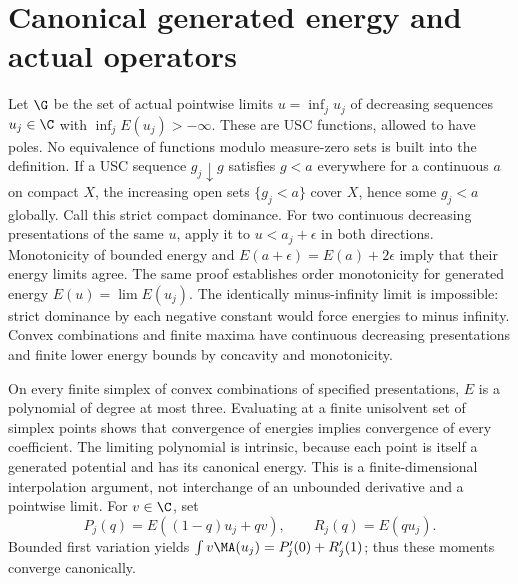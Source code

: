 \section{Canonical generated energy and actual operators}
Let $\G$ be the set of actual pointwise limits $u=\inf_j u_j$ of decreasing
sequences $u_j\in\C$ with $\inf_jE(u_j)>-\infty$.
These are USC functions, allowed to have poles. No equivalence of functions
modulo measure-zero sets is built into the definition.
If a USC sequence $g_j\downarrow g$ satisfies $g<a$ everywhere for a continuous
$a$ on compact $X$, the increasing open sets $\{g_j<a\}$ cover $X$, hence
some $g_j<a$ globally. Call this strict compact dominance.
For two continuous decreasing presentations of the same $u$, apply it to
$u<a_j+\epsilon$ in both directions. Monotonicity of bounded energy and
$E(a+\epsilon)=E(a)+2\epsilon$ imply that their energy limits agree.
The same proof establishes order monotonicity for generated energy
$E(u)=\lim E(u_j)$. The identically minus-infinity limit is impossible:
strict dominance by each negative constant would force energies to minus
infinity. Convex combinations and finite maxima have continuous decreasing
presentations and finite lower energy bounds by concavity and monotonicity.

On every finite simplex of convex combinations of specified presentations,
$E$ is a polynomial of degree at most three. Evaluating at a finite unisolvent
set of simplex points shows that convergence of energies implies convergence
of every coefficient. The limiting polynomial is intrinsic, because each
point is itself a generated potential and has its canonical energy.
This is a finite-dimensional interpolation argument, not interchange of an
unbounded derivative and a pointwise limit.
For $v\in\C$, set
\[
 P_j(q)=E((1-q)u_j+qv),\qquad R_j(q)=E(qu_j).
\]
Bounded first variation yields
$\int v\MA(u_j)=P_j'(0)+R_j'(1)$; thus these moments converge canonically.

